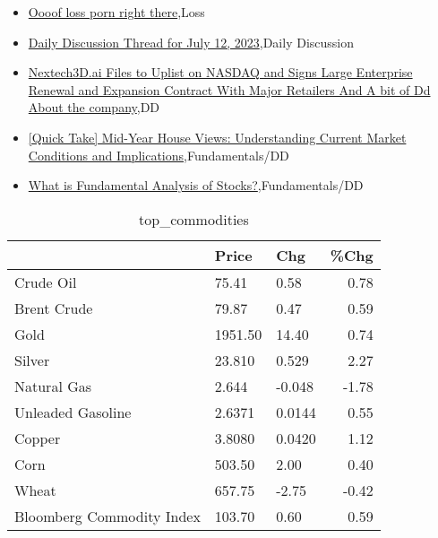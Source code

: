 \documentclass{article}%
\begin{document}
%
\begin{itemize}%
\item%
\href{https://reddit.com/r/wallstreetbets/comments/14xnbdu/oooof\_loss\_porn\_right\_there/}{Oooof loss porn right there},Loss%
\item%
\href{https://reddit.com/r/wallstreetbets/comments/14xk2jk/daily\_discussion\_thread\_for\_july\_12\_2023/}{Daily Discussion Thread for July 12, 2023},Daily Discussion%
\item%
\href{https://reddit.com/r/Baystreetbets/comments/14xkkjt/nextech3dai\_files\_to\_uplist\_on\_nasdaq\_and\_signs/}{Nextech3D.ai Files to Uplist on NASDAQ and Signs Large Enterprise Renewal and Expansion Contract With Major Retailers And A bit of Dd About the company},DD%
\item%
\href{https://reddit.com/r/StockMarket/comments/14xjkol/quick\_take\_midyear\_house\_views\_understanding/}{[Quick Take] Mid-Year House Views: Understanding Current Market Conditions and Implications},Fundamentals/DD%
\item%
\href{https://reddit.com/r/StockMarket/comments/14xh99k/what\_is\_fundamental\_analysis\_of\_stocks/}{What is Fundamental Analysis of Stocks?},Fundamentals/DD%
\end{itemize}%


\begin{table}[htbp]%
\caption{top\_commodities}%
\centering%
\begin{adjustbox}{width=1\textwidth}%
\begin{tabular}{lllr}
\toprule
                          &   Price &    Chg &  \%Chg \\
\midrule
               Crude Oil  &   75.41 &   0.58 &  0.78 \\
             Brent Crude  &   79.87 &   0.47 &  0.59 \\
                    Gold  & 1951.50 &  14.40 &  0.74 \\
                  Silver  &  23.810 &  0.529 &  2.27 \\
             Natural Gas  &   2.644 & -0.048 & -1.78 \\
       Unleaded Gasoline  &  2.6371 & 0.0144 &  0.55 \\
                  Copper  &  3.8080 & 0.0420 &  1.12 \\
                    Corn  &  503.50 &   2.00 &  0.40 \\
                   Wheat  &  657.75 &  -2.75 & -0.42 \\
Bloomberg Commodity Index &  103.70 &   0.60 &  0.59 \\
\bottomrule
\end{tabular}
%
\end{adjustbox}%
\end{table}
\end{document}
